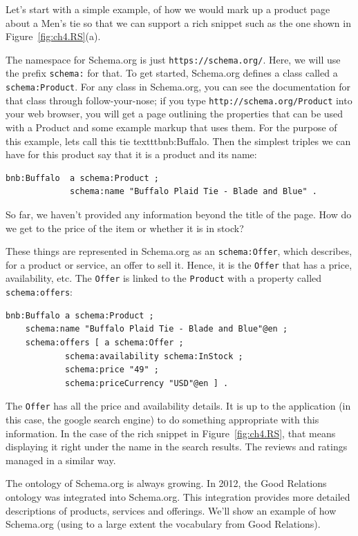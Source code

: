 Let's start with a simple example, of how we would mark up a product page about 
a Men's tie so that we can support a rich snippet such as the one shown in Figure~\ref{fig:ch4.RS}(a).

The namespace for Schema.org is just \texttt{https://schema.org/}. Here, we will 
use the prefix \texttt{schema:} for that. To get started, Schema.org defines a class called 
a \texttt{schema:Product}.  For any class in Schema.org, you can see the 
documentation for that class through follow-your-nose; if you type 
\texttt{http://schema.org/Product} into your web browser, you will get a page outlining
the properties that can be used with a Product and some example markup that uses them. 
For the purpose of this example, lets call this tie texttt{bnb:Buffalo}.  Then 
the simplest triples we can have for this product say that it is a product and its 
name:

\begin{lstlisting}
bnb:Buffalo  a schema:Product ;
             schema:name "Buffalo Plaid Tie - Blade and Blue" .
\end{lstlisting}

So far, we haven't provided any information beyond the title of the page.  How do we get
to the price of the item or whether it is in stock? 

These things are represented in Schema.org as an \texttt{schema:Offer}, which describes, 
for a product or service, an offer to sell it.  Hence, it is the \texttt{Offer} that has
a price, availability, etc.  The \texttt{Offer} is linked to the \texttt{Product} with a 
property called \texttt{schema:offers}:

\begin{lstlisting}
bnb:Buffalo a schema:Product ;
    schema:name "Buffalo Plaid Tie - Blade and Blue"@en ;
    schema:offers [ a schema:Offer ;
            schema:availability schema:InStock ;
            schema:price "49" ;
            schema:priceCurrency "USD"@en ] .
\end{lstlisting}

The \texttt{Offer} has all the price and availability details.  It is up to the 
application (in this case, the google search engine) to do something appropriate
with this information.  In the case of the rich snippet in Figure~\ref{fig:ch4.RS}, that
means displaying it right under the name in the search results.  The reviews and ratings 
managed in a similar way. 

The ontology of Schema.org is always growing.  In 2012, the Good Relations ontology
was integrated into Schema.org.  This integration provides more detailed descriptions of 
products, services and offerings.  We'll show an example of how Schema.org 
(using to a large extent the vocabulary from Good Relations).

